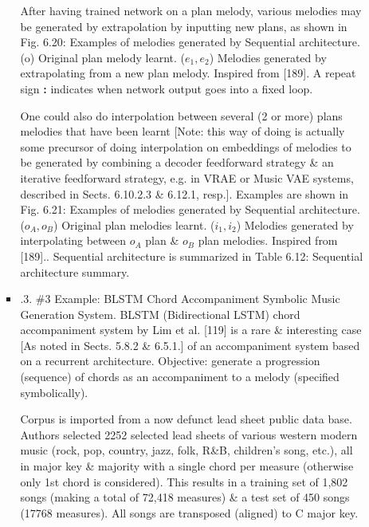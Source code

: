 \documentclass{article}
\begin{document}
\begin{itemize}
\begin{itemize}
\begin{itemize}
			After having trained network on a plan melody, various melodies may be generated by extrapolation by inputting new plans, as shown in {\sf Fig. 6.20: Examples of melodies generated by Sequential architecture. (o) Original plan melody learnt. ($e_1,e_2$) Melodies generated by extrapolating from a new plan melody. Inspired from [189].} A repeat sign {\bf:} indicates when network output goes into a fixed loop.

			One could also do interpolation between several (2 or more) plans melodies that have been learnt [Note: this way of doing is actually some precursor of doing interpolation on embeddings of melodies to be generated by combining a decoder feedforward strategy \& an iterative feedforward strategy, e.g. in VRAE or Music VAE systems, described in Sects. 6.10.2.3 \& 6.12.1, resp.]. Examples are shown in {\sf Fig. 6.21: Examples of melodies generated by Sequential architecture. ($o_A,o_B$) Original plan melodies learnt. ($i_1,i_2$) Melodies generated by interpolating between $o_A$ plan \& $o_B$ plan melodies. Inspired from [189].}. Sequential architecture is summarized in {\sf Table 6.12: Sequential architecture summary}.
			\item {.3. \#3 Example: BLSTM Chord Accompaniment Symbolic Music Generation System.} BLSTM (Bidirectional LSTM) chord accompaniment system by Lim et al. [119] is a rare \& interesting case [As noted in Sects. 5.8.2 \& 6.5.1.] of an accompaniment system based on a recurrent architecture. Objective: generate a progression (sequence) of chords as an accompaniment to a melody (specified symbolically).

			Corpus is imported from a now defunct lead sheet public data base. Authors selected 2252 selected lead sheets of various western modern music (rock, pop, country, jazz, folk, R\&B, children's song, etc.), all in major key \& majority with a single chord per measure (otherwise only 1st chord is considered). This results in a training set of 1,802 songs (making a total of 72,418 measures) \& a test set of 450 songs (17768 measures). All songs are transposed (aligned) to C major key.


\end{itemize}
\end{itemize}
\end{itemize}
\end{document}
